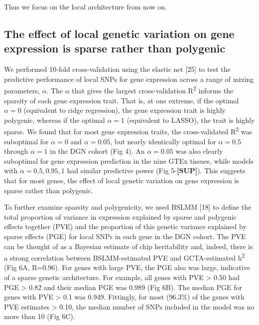 \documentclass[]{article}
\begin{document}
Thus we focus on the local architecture from now on.

\subsection{The effect of local genetic variation on gene expression is
sparse rather than
polygenic}\label{the-effect-of-local-genetic-variation-on-gene-expression-is-sparse-rather-than-polygenic}

We performed 10-fold cross-validation using the elastic net {[}25{]} to
test the predictive performance of local SNPs for gene expression across
a range of mixing parameters, \(\alpha\). The \(\alpha\) that gives the
largest cross-validation R\textsuperscript{2} informs the sparsity of
each gene expression trait. That is, at one extreme, if the optimal
\(\alpha=0\) (equivalent to ridge regression), the gene expression trait
is highly polygenic, whereas if the optimal \(\alpha=1\) (equivalent to
LASSO), the trait is highly sparse. We found that for most gene
expression traits, the cross-validated R\textsuperscript{2} was
suboptimal for \(\alpha=0\) and \(\alpha=0.05\), but nearly identically
optimal for \(\alpha=0.5\) through \(\alpha=1\) in the DGN cohort (Fig
4). An \(\alpha=0.05\) was also clearly suboptimal for gene expression
prediction in the nine GTEx tissues, while models with
\(\alpha=0.5,0.95,1\) had similar predictive power (Fig
5-\textbf{{[}SUP{]}}). This suggests that for most genes, the effect of
local genetic variation on gene expression is sparse rather than
polygenic.

To further examine sparsity and polygenicity, we used BSLMM {[}18{]} to
define the total proportion of variance in expression explained by
sparse and polygenic effects together (PVE) and the proportion of this
genetic variance explained by sparse effects (PGE) for local SNPs in
each gene in the DGN cohort. The PVE can be thought of as a Bayesian
estimate of chip heritability and, indeed, there is a strong correlation
between BSLMM-estimated PVE and GCTA-estimated h\textsuperscript{2} (Fig
6A, R=0.96). For genes with large PVE, the PGE also was large,
indicative of a sparse genetic architecture. For example, all genes with
PVE \textgreater{} 0.50 had PGE \textgreater{} 0.82 and their median PGE
was 0.989 (Fig 6B). The median PGE for genes with PVE \textgreater{} 0.1
was 0.949. Fittingly, for most (96.3\%) of the genes with PVE estimates
\textgreater{} 0.10, the median number of SNPs included in the model was
no more than 10 (Fig 6C).
\end{document}
